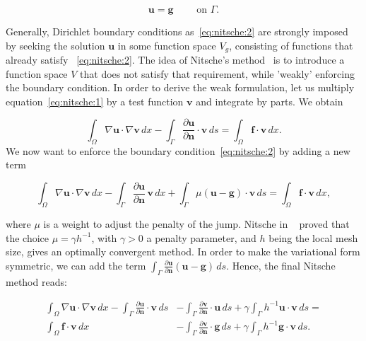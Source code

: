 \documentclass[11pt,a4paper,titlepage]{report}
\begin{document}
\begin{equation}
\mathbf{u} = \mathbf{g} \qquad \text{ on } \Gamma.
\label{eq:nitsche:2}
\end{equation}

Generally, Dirichlet boundary conditions as~\eqref{eq:nitsche:2} are strongly imposed by seeking the solution $\mathbf{u}$ in some function space $V_g$, consisting of functions that already satisfy ~\eqref{eq:nitsche:2}. The idea of Nitsche's method~\cite{Nitsche1977} is to introduce a function space $V$ that does not satisfy that requirement, while 'weakly' enforcing the boundary condition. In order to derive the weak formulation, let us multiply equation~\eqref{eq:nitsche:1} by a test function $\mathbf{v}$ and integrate by parts. We obtain 

\begin{equation}
\label{eq:nitsche:3}
\int_{\Omega} \nabla \mathbf{u} \cdot \nabla \mathbf{v} \, dx
- \int_{\Gamma} \frac{\partial \mathbf{u}}{\partial \mathbf{n}} \cdot \mathbf{v} \, ds
= \int_{\Omega} \mathbf{f} \cdot \mathbf{v} \, dx. 
\end{equation}
We now want to enforce the boundary condition~\eqref{eq:nitsche:2} by adding a new term 

\begin{equation}
\int_{\Omega} \nabla \mathbf{u} \cdot \nabla \mathbf{v} \, dx
- \int_{\Gamma} \frac{\partial \mathbf{u}}{\partial \mathbf{n}} \, \mathbf{v} \, dx 
+ \int_{\Gamma} \mu (\mathbf{u} - \mathbf{g}) \cdot \mathbf{v} \, ds
= \int_{\Omega} \mathbf{f} \cdot \mathbf{v} \, dx,
\end{equation}

where $\mu$ is a  weight to adjust the penalty of the jump. Nitsche in ~\cite{Nitsche1977} proved that the choice $\mu = \gamma h^{-1}$, with $\gamma > 0$ a penalty parameter, and $h$ being the local mesh size, gives an optimally convergent method. In order to make the variational form symmetric, we can add the term $\int_{\Gamma} \frac{\partial \mathbf{u}}{\partial \mathbf{n}}(\mathbf{u}-\mathbf{g}) \, ds$. Hence, the final Nitsche method reads:

\begin{equation}
\begin{split}
\int_{\Omega} \nabla \mathbf{u} \cdot \nabla \mathbf{v} \, dx
- \int_{\Gamma} \frac{\partial \mathbf{u}}{\partial \mathbf{n}} \cdot \mathbf{v} \, ds
& - \int_{\Gamma} \frac{\partial \mathbf{v}}{\partial \mathbf{n}} \cdot \mathbf{u} \, ds 
+ \gamma \int_{\Gamma} h^{-1} \mathbf{u} \cdot \mathbf{v} \, ds = \\
	\int_{\Omega} \mathbf{f} \cdot \mathbf{v} \, dx
&- \int_{\Gamma} \frac{\partial \mathbf{v}}{\partial \mathbf{n}} \cdot \mathbf{g} \, ds
+ \gamma \int_{\Gamma} h^{-1} \mathbf{g} \cdot \mathbf{v} \, ds.
\end{split}
\end{equation}
\end{document}
